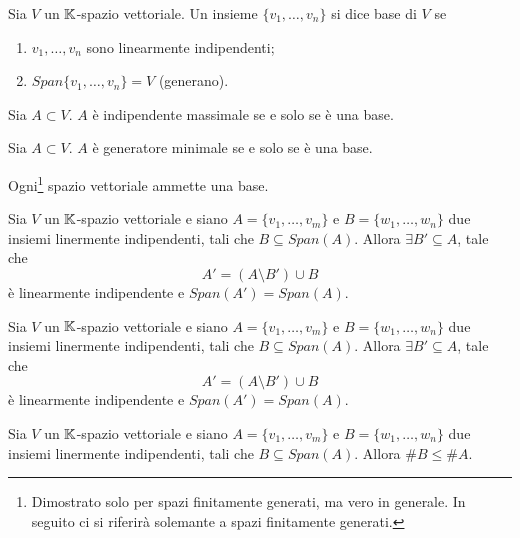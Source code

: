 \begin{definition}[Base]
	Sia $ V $ un $ \mathbb{K} $-spazio vettoriale. Un insieme $ \{v_1, \ldots, v_n\} $ si dice base di $ V $ se
	\begin{enumerate}[label=(\roman*)]
		\item $ v_1, \ldots, v_n $ sono linearmente indipendenti;
		\item $ Span\{v_1, \ldots , v_n\} = V $ (generano).
	\end{enumerate}
\end{definition}

\begin{lemma}
	Sia $A \subset V$. $A$ è indipendente massimale se e solo se è una base. 
\end{lemma}

\begin{lemma}
        Sia $A \subset V$. $A$ è generatore minimale se e solo se è una base.
\end{lemma}

\begin{thm}
	Ogni\footnote{Dimostrato solo per spazi finitamente generati, ma vero in generale. In seguito ci si riferirà solemante a spazi finitamente generati.} 
	spazio vettoriale ammette una base.
\end{thm}


\begin{lemma}
	Sia $ V $ un $ \mathbb{K} $-spazio vettoriale e siano $ A = \{v_1, \ldots, v_m\} $ e $ B = \{  w_1, \ldots, w_n \} $ due insiemi linermente indipendenti,
	tali che $ B \subseteq Span(A) $. Allora $\exists B' \subseteq A $, tale che
	\[ A' = \left ( A \setminus B' \right ) \cup B \] è linearmente indipendente e $Span(A') = Span(A)$. 
\end{lemma}

\begin{lemma}
	Sia $ V $ un $ \mathbb{K} $-spazio vettoriale e siano $ A = \{v_1, \ldots, v_m\} $ e $ B = \{  w_1, \ldots, w_n \} $ due insiemi linermente indipendenti,
	tali che $ B \subseteq Span(A) $. Allora $\exists B' \subseteq A $, tale che
	\[ A' = \left ( A \setminus B' \right ) \cup B \] è linearmente indipendente e $Span(A') = Span(A)$. 
\end{lemma}

\begin{corollary}
        Sia $ V $ un $ \mathbb{K} $-spazio vettoriale e siano $ A = \{v_1, \ldots, v_m\} $ e $ B = \{  w_1, \ldots, w_n \} $ due insiemi linermente indipendenti,
        tali che $ B \subseteq Span(A) $. Allora $ \#B \le \#A $.
\end{corollary}

